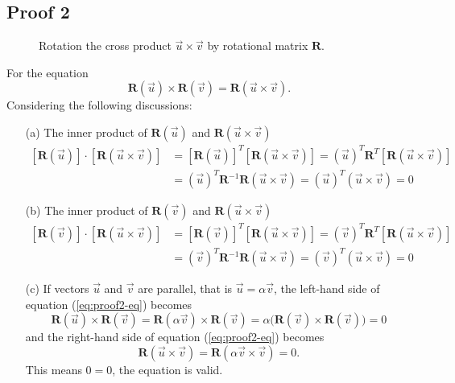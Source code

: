 \documentclass[12pt]{article}
\begin{document}
\subsection{Proof 2}
\begin{figure}[h]
\centering

\caption{Rotation the cross product $\vec{u}\times\vec{v}$ by rotational matrix $\mathbf{R}$.}
\label{fig:1}
\end{figure}
\noindent For the equation 
\begin{equation}
\mathbf{R}\left(\vec{u}\right) \times \mathbf{R}\left(\vec{v}\right) = \mathbf{R}\left(\vec{u}\times\vec{v}\right).
\label{eq:proof2-eq}
\end{equation}
Considering the following discussions:
\begin{itemize}
\item[(a)] The inner product of $\mathbf{R}\left(\vec{u}\right)$ and $\mathbf{R}\left(\vec{u}\times\vec{v}\right)$ 
\begin{align}
\left[\mathbf{R}\left(\vec{u}\right)\right]\cdot \left[\mathbf{R}\left(\vec{u}\times\vec{v}\right)\right]
&= \left[\mathbf{R}\left(\vec{u}\right)\right]^{T}\left[\mathbf{R}\left(\vec{u}\times\vec{v}\right)\right]
= \left(\vec{u}\right)^{T}\mathbf{R}^{T}\left[\mathbf{R}\left(\vec{u}\times\vec{v}\right)\right]\\
&= \left(\vec{u}\right)^{T}\mathbf{R}^{-1}\mathbf{R}\left(\vec{u}\times\vec{v}\right)
= \left(\vec{u}\right)^{T}\left(\vec{u}\times\vec{v}\right) = 0
\end{align}

\item[(b)] The inner product of $\mathbf{R}\left(\vec{v}\right)$ and $\mathbf{R}\left(\vec{u}\times\vec{v}\right)$ 
\begin{align}
\left[\mathbf{R}\left(\vec{v}\right)\right]\cdot \left[\mathbf{R}\left(\vec{u}\times\vec{v}\right)\right]
&= \left[\mathbf{R}\left(\vec{v}\right)\right]^{T}\left[\mathbf{R}\left(\vec{u}\times\vec{v}\right)\right]
= \left(\vec{v}\right)^{T}\mathbf{R}^{T}\left[\mathbf{R}\left(\vec{u}\times\vec{v}\right)\right]\\
&= \left(\vec{v}\right)^{T}\mathbf{R}^{-1}\mathbf{R}\left(\vec{u}\times\vec{v}\right)
= \left(\vec{v}\right)^{T}\left(\vec{u}\times\vec{v}\right) = 0
\end{align}

\item[(c)] If vectors $\vec{u}$ and $\vec{v}$ are parallel, that is $\vec{u} = \alpha \vec{v}$, the left-hand side of equation (\ref{eq:proof2-eq}) becomes
\begin{equation}
\mathbf{R}\left(\vec{u}\right) \times \mathbf{R}\left(\vec{v}\right) = 
\mathbf{R}\left(\alpha\vec{v}\right) \times \mathbf{R}\left(\vec{v}\right) = 
\alpha\Big(\mathbf{R}\left(\vec{v}\right) \times \mathbf{R}\left(\vec{v}\right)\Big) = 0
\end{equation}
and the right-hand side of equation (\ref{eq:proof2-eq}) becomes
\begin{equation}
\mathbf{R}\left(\vec{u}\times\vec{v}\right) = \mathbf{R}\left(\alpha \vec{v}\times\vec{v}\right) = 0.
\end{equation}
This means $0=0$, the equation is valid.
\end{itemize}
\end{document}
